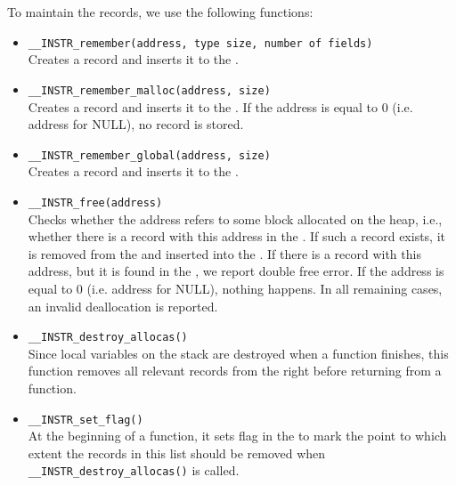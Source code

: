 To maintain the records, we use the following functions:
\begin{itemize}
  \item \texttt{\_\_INSTR\_remember(address, type size, number of fields)}
  \\Creates a record and inserts it to the \stacklist.
  \item \texttt{\_\_INSTR\_remember\_malloc(address, size)}
  \\Creates a record and inserts it to the \heaplist. If the address is equal
  to 0 (i.e.  address for NULL), no record is stored.
  \item \texttt{\_\_INSTR\_remember\_global(address, size)}
  \\Creates a record and inserts it to the \globalslist.
  \item \texttt{\_\_INSTR\_free(address)}
  \\Checks whether the address refers to some block allocated on the heap,
  i.e., whether there is a record with this address in the \heaplist. If such a
  record exists, it is removed from the \heaplist and inserted into the
  \dealloclist. If there is a record with this address, but it is found in the
  \dealloclist, we report double free error. If the address is equal to 0 (i.e.
  address for NULL), nothing happens. In all remaining cases, an invalid
  deallocation is reported.
  \item \texttt{\_\_INSTR\_destroy\_allocas()}
  \\ Since local variables on the stack are destroyed when a function
  finishes, this function removes all relevant records from the \stacklist right
  before returning from a function.
  \item \texttt{\_\_INSTR\_set\_flag()}
  \\ At the beginning of a function, it sets flag in the \stacklist to mark the
  point to which extent the records in this list should be removed when
  \texttt{\_\_INSTR\_destroy\_allocas()} is called.
\end{itemize}

